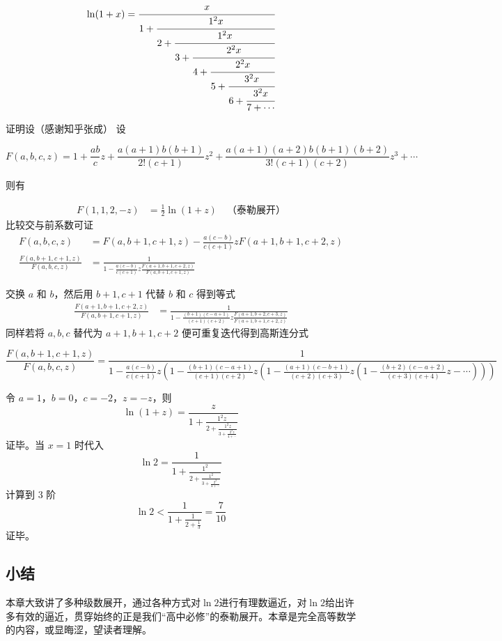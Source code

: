 \documentclass[12pt]{article}
\theoremstyle{definition}
\theoremstyle{plain}
\theoremstyle{definition}
\begin{document}
\[
\ln(1 + x) = \cfrac{x}{1 + \cfrac{1^{2}x}{2 + \cfrac{1^{2}x}{3 + \cfrac{2^{2}x}{4 + \cfrac{2^{2}x}{5 + \cfrac{3^{2}x}{6 + \cfrac{3^{2}x}{7 + \cdots}}}}}}}
\]

证明设（感谢知乎张成） 设

\[F(a,b,c,z) = 1 + \frac{ab}{c}z + \frac{a(a + 1)b(b + 1)}{2!(c + 1)}z^{2} + \frac{a(a + 1)(a + 2)b(b + 1)(b + 2)}{3!(c + 1)(c + 2)}z^{3} + \cdots\]

则有

\begin{align*}
F(1,1,2, -z) &= \frac{1}{2}\ln(1 + z) \quad \text{（泰勒展开）}
\end{align*}
比较交与前系数可证
\begin{align*}
F(a,b,c,z) &= F(a,b + 1,c + 1,z) - \frac{a(c - b)}{c(c + 1)}zF(a + 1,b + 1,c + 2,z) \\
\frac{F(a,b + 1,c + 1,z)}{F(a,b,c,z)} &= \frac{1}{1 - \frac{a(c - b)}{c(c + 1)}z\frac{F(a + 1,b + 1,c + 2,z)}{F(a,b + 1,c + 1,z)}}
\end{align*}

交换 \(a\) 和 \(b\)，然后用 \(b + 1,c + 1\) 代替 \(b\) 和 \(c\) 得到等式
\begin{align*}
\frac{F(a + 1,b + 1,c + 2,z)}{F(a,b + 1,c + 1,z)} &= \frac{1}{1 - \frac{(b + 1)(c - a + 1)}{(c + 1)(c + 2)}z\frac{F(a + 1,b + 2,c + 3,z)}{F(a + 1,b + 1,c + 2,z)}}
\end{align*}
同样若将 \(a,b,c\) 替代为 \(a + 1,b + 1,c + 2\) 便可重复迭代得到高斯连分式

\[\frac{F(a,b + 1,c + 1,z)}{F(a,b,c,z)} = \frac{1}{1 - \frac{a(c - b)}{c(c + 1)}z\left( 1 - \frac{(b + 1)(c - a + 1)}{(c + 1)(c + 2)}z\left( 1 - \frac{(a + 1)(c - b + 1)}{(c + 2)(c + 3)}z\left( 1 - \frac{(b + 2)(c - a + 2)}{(c + 3)(c + 4)}z - \cdots \right) \right) \right)}\]

令 \(a = 1\)，\(b = 0\)，\(c = -2\)，\(z = -z\)，则
\[\ln(1 + z) = \frac{z}{1 + \frac{1^{2}z}{2 + \frac{1^{2}z}{3 + \frac{2^{2}z}{4 + \cdots}}}}\]
证毕。当 \(x = 1\) 时代入
\[\ln 2 = \frac{1}{1 + \frac{1^{2}}{2 + \frac{1^{2}}{3 + \frac{2^{2}}{4 + \cdots}}}}\]
计算到 3 阶
\[\ln 2 < \frac{1}{1 + \frac{1}{2 + \frac{1}{3}}} = \frac{7}{10}\]
证毕。

\subsection{小结}

本章大致讲了多种级数展开，通过各种方式对\(\ln 2\)进行有理数逼近，对\(\ln 2\)给出许多有效的逼近，贯穿始终的正是我们``高中必修''的泰勒展开。本章是完全高等数学的内容，或显晦涩，望读者理解。
\end{document}
